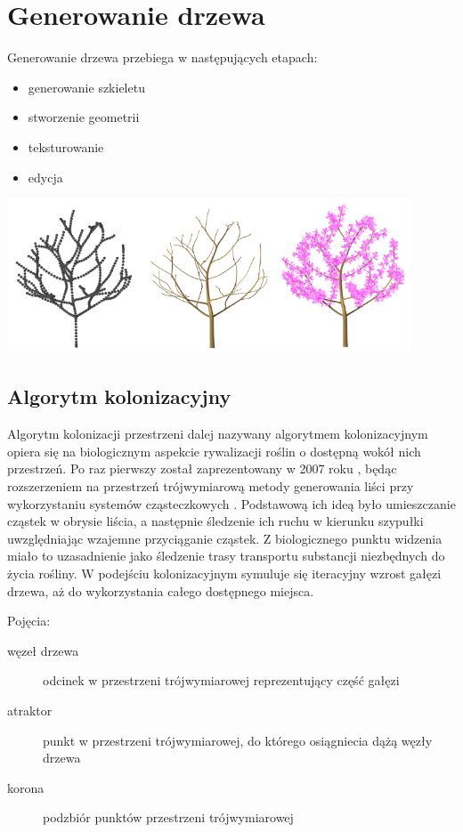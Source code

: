 \section{Generowanie drzewa}
Generowanie drzewa przebiega w następujących etapach:
\begin{itemize}
\item generowanie szkieletu
\item stworzenie geometrii
\item teksturowanie
\item edycja
\end{itemize}
\begin{center}
	\includegraphics[width=120mm]{images/colonization/generation.png}
	\label{colonization_generation}
\end{center}
\subsection{Algorytm kolonizacyjny}
Algorytm kolonizacji przestrzeni dalej nazywany algorytmem kolonizacyjnym opiera się na biologicznym aspekcie rywalizacji roślin o dostępną wokół nich przestrzeń. 
Po raz pierwszy został zaprezentowany w 2007 roku \cite{spaceColonization}, będąc rozszerzeniem na przestrzeń trójwymiarową metody generowania liści przy wykorzystaniu systemów cząsteczkowych \cite{particleMethod}. 
Podstawową ich ideą było umieszczanie cząstek w obrysie liścia, a następnie śledzenie ich ruchu w kierunku szypułki uwzględniając wzajemne przyciąganie cząstek. 
Z biologicznego punktu widzenia miało to uzasadnienie jako śledzenie trasy transportu substancji niezbędnych do życia rośliny. 
W podejściu kolonizacyjnym symuluje się iteracyjny wzrost gałęzi drzewa, aż do wykorzystania całego dostępnego miejsca.

\newpage
Pojęcia:
\begin{description}
	\item[węzeł drzewa] odcinek w przestrzeni trójwymiarowej reprezentujący część gałęzi
	\item[atraktor] punkt w przestrzeni trójwymiarowej, do którego osiągniecia dążą węzły drzewa
	\item[korona] podzbiór punktów przestrzeni trójwymiarowej
\end{description}
